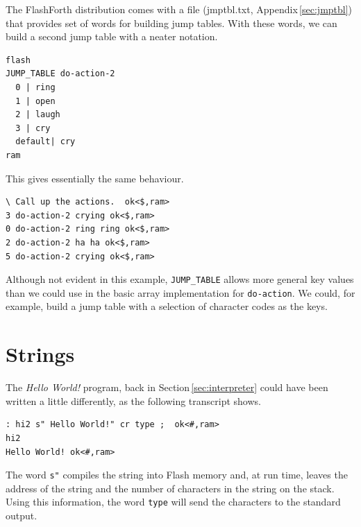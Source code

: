 \documentclass[12pt,a4paper]{article}
\begin{document}
\medskip
The FlashForth distribution comes with a file (jmptbl.txt, Appendix\,\ref{sec:jmptbl})
that provides set of words for building jump tables.
With these words, we can build a second jump table with a neater notation.
\begin{verbatim}
flash
JUMP_TABLE do-action-2
  0 | ring
  1 | open
  2 | laugh 
  3 | cry
  default| cry
ram
\end{verbatim}
This gives essentially the same behaviour.
\begin{verbatim}
\ Call up the actions.  ok<$,ram>
3 do-action-2 crying ok<$,ram>
0 do-action-2 ring ring ok<$,ram>
2 do-action-2 ha ha ok<$,ram>
5 do-action-2 crying ok<$,ram>
\end{verbatim}
Although not evident in this example, \verb!JUMP_TABLE! allows more general key values
than we could use in the basic array implementation for \verb!do-action!.
We could, for example, build a jump table with a selection of character codes as the keys.

\bigskip
\section{Strings}
%
The \textit{Hello World!} program, back in Section\,\ref{sec:interpreter}
could have been written a little differently, as the following transcript shows.
\begin{verbatim}
: hi2 s" Hello World!" cr type ;  ok<#,ram>
hi2 
Hello World! ok<#,ram>
\end{verbatim}
The word \verb!s"! compiles the string into Flash memory and, at run time,
leaves the address of the string and the number of characters in the string
on the stack.
Using this information, the word \verb!type! will send the characters to the standard output. 

\medskip
\end{document}
